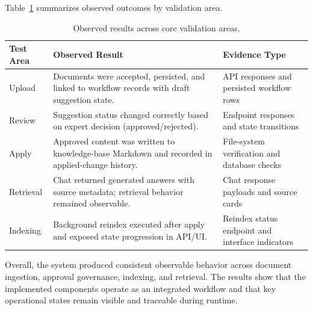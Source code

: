 Table~\ref{tab:results_summary} summarizes observed outcomes by validation area.

\begin{table}[H]
\centering
\small
\begin{tabular}{p{2.6cm} p{6.8cm} p{3.8cm}}
\textbf{Test Area} & \textbf{Observed Result} & \textbf{Evidence Type} \\
\hline
Upload & Documents were accepted, persisted, and linked to workflow records with draft suggestion state. & API responses and persisted workflow rows \\
\hline
Review & Suggestion status changed correctly based on expert decision (approved/rejected). & Endpoint responses and state transitions \\
\hline
Apply & Approved content was written to knowledge-base Markdown and recorded in applied-change history. & File-system verification and database checks \\
\hline
Retrieval & Chat returned generated answers with source metadata; retrieval behavior remained observable. & Chat response payloads and source cards \\
\hline 
Indexing & Background reindex executed after apply and exposed state progression in API/UI. & Reindex status endpoint and interface indicators \\
\hline
\end{tabular}
\caption{Observed results across core validation areas.}
\label{tab:results_summary}
\end{table}

Overall, the system produced consistent observable behavior across document ingestion, approval governance, indexing, and retrieval. The results show that the implemented components operate as an integrated workflow and that key operational states remain visible and traceable during runtime.